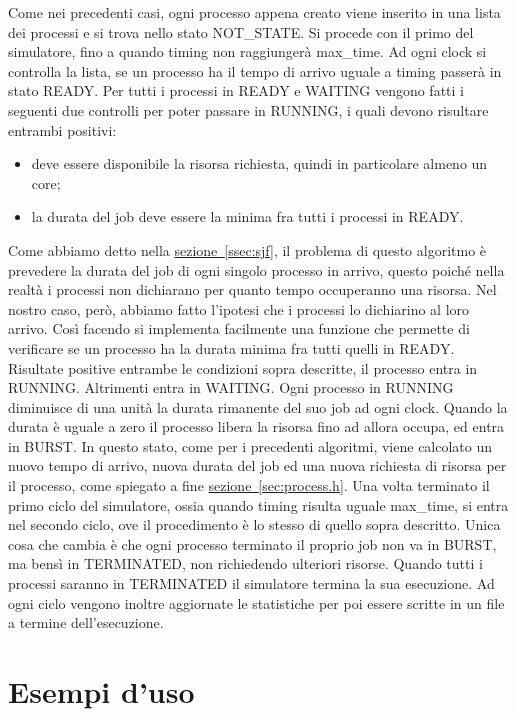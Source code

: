 \documentclass[Lau, oneside]{sapthesis}%
\begin{document}
Come nei precedenti casi, ogni processo appena creato viene inserito in una lista dei processi e si trova nello stato NOT\_STATE.
Si procede con il primo del simulatore, fino a quando timing non raggiungerà max\_time.
Ad ogni clock si controlla la lista, se un processo ha il tempo di arrivo uguale a timing passerà in stato READY.
Per tutti i processi in READY e WAITING vengono fatti i seguenti due controlli per poter passare in RUNNING, i quali devono risultare entrambi positivi:
\begin{itemize}
    \item deve essere disponibile la risorsa richiesta, quindi in particolare almeno un core;
    \item la durata del job deve essere la minima fra tutti i processi in READY.
\end{itemize}
Come abbiamo detto nella \hyperref[ssec:sjf]{sezione~\ref*{ssec:sjf}}, il problema di questo algoritmo è prevedere la durata del job di ogni singolo processo in arrivo, questo poiché nella realtà i processi non dichiarano per quanto tempo occuperanno una risorsa.
Nel nostro caso, però, abbiamo fatto l'ipotesi che i processi lo dichiarino al loro arrivo.
Così facendo si implementa facilmente una funzione che permette di verificare se un processo ha la durata minima fra tutti quelli in READY.
Risultate positive entrambe le condizioni sopra descritte, il processo entra in RUNNING.
Altrimenti entra in WAITING.
Ogni processo in RUNNING diminuisce di una unità la durata rimanente del suo job ad ogni clock.
Quando la durata è uguale a zero il processo libera la risorsa fino ad allora occupa, ed entra in BURST.
In questo stato, come per i precedenti algoritmi, viene calcolato un nuovo tempo di arrivo, nuova durata del job ed una nuova richiesta di risorsa per il processo, come spiegato a fine \hyperref[sec:process.h]{sezione~\ref*{sec:process.h}}.
Una volta terminato il primo ciclo del simulatore, ossia quando timing risulta uguale max\_time, si entra nel secondo ciclo, ove il procedimento è lo stesso di quello sopra descritto.
Unica cosa che cambia è che ogni processo terminato il proprio job non va in BURST, ma bensì in TERMINATED, non richiedendo ulteriori risorse.
Quando tutti i processi saranno in TERMINATED il simulatore termina la sua esecuzione.
Ad ogni ciclo vengono inoltre aggiornate le statistiche per poi essere scritte in un file a termine dell'esecuzione.

\chapter{Esempi d'uso}
\label{chap:3}
\end{document}
